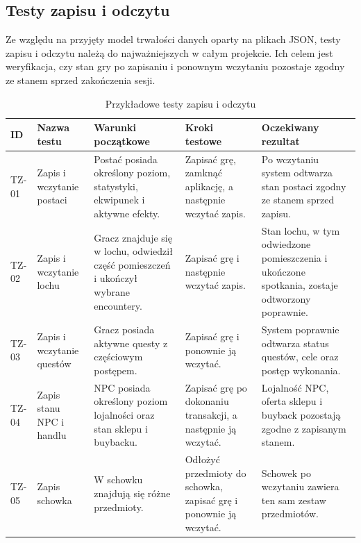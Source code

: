 \subsection{Testy zapisu i odczytu}
\label{subsec:testy-zapisu-i-odczytu}

Ze względu na przyjęty model trwałości danych oparty na plikach JSON, testy zapisu i odczytu należą do najważniejszych w całym projekcie. Ich celem jest weryfikacja, czy stan gry po zapisaniu i ponownym wczytaniu pozostaje zgodny ze stanem sprzed zakończenia sesji.

\begin{table}[H]
\centering
\caption{Przykładowe testy zapisu i odczytu}
\label{tab:testy-zapis-odczyt}
\begin{threeparttable}
\begin{tabularx}{\linewidth}{|p{1.6cm}|p{3.2cm}|X|X|X|}
\hline
\textbf{ID} & \textbf{Nazwa testu} & \textbf{Warunki początkowe} & \textbf{Kroki testowe} & \textbf{Oczekiwany rezultat} \\
\hline
TZ-01 & Zapis i wczytanie postaci & Postać posiada określony poziom, statystyki, ekwipunek i aktywne efekty. & Zapisać grę, zamknąć aplikację, a następnie wczytać zapis. & Po wczytaniu system odtwarza stan postaci zgodny ze stanem sprzed zapisu. \\
\hline
TZ-02 & Zapis i wczytanie lochu & Gracz znajduje się w lochu, odwiedził część pomieszczeń i ukończył wybrane encountery. & Zapisać grę i następnie wczytać zapis. & Stan lochu, w tym odwiedzone pomieszczenia i ukończone spotkania, zostaje odtworzony poprawnie. \\
\hline
TZ-03 & Zapis i wczytanie questów & Gracz posiada aktywne questy z częściowym postępem. & Zapisać grę i ponownie ją wczytać. & System poprawnie odtwarza status questów, cele oraz postęp wykonania. \\
\hline
TZ-04 & Zapis stanu NPC i handlu & NPC posiada określony poziom lojalności oraz stan sklepu i buybacku. & Zapisać grę po dokonaniu transakcji, a następnie ją wczytać. & Lojalność NPC, oferta sklepu i buyback pozostają zgodne z zapisanym stanem. \\
\hline
TZ-05 & Zapis schowka & W schowku znajdują się różne przedmioty. & Odłożyć przedmioty do schowka, zapisać grę i ponownie ją wczytać. & Schowek po wczytaniu zawiera ten sam zestaw przedmiotów. \\
\hline
\end{tabularx}
\end{threeparttable}
\end{table}


